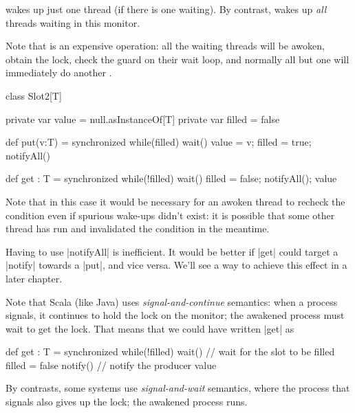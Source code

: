 
\begin{slide}


 wakes up just one thread (if there is one waiting).  By
contrast,  wakes up \emph{all} threads waiting in this
monitor. 

Note that  is an expensive operation: all the waiting
threads will be awoken, obtain the lock, check the guard on their wait loop,
and normally all but one will immediately do another .
\end{slide}


\begin{slide}

\begin{scala}
class Slot2[T]{
  private var value = null.asInstanceOf[T]
  private var filled = false

  def put(v:T) = synchronized{
    while(filled) wait()
    value = v; filled = true; notifyAll()
  }

  def get : T = synchronized{
    while(!filled) wait()
    filled = false; notifyAll(); value
  }
}
\end{scala}
%
\end{slide}


\begin{slide}

Note that in this case it would be necessary for an awoken thread to recheck
the condition even if spurious wake-ups didn't exist: it is possible that some
other thread has run and invalidated the condition in the meantime.

Having to use |notifyAll| is inefficient.  It would be better if |get| could
target a |notify| towards a |put|, and vice versa.  We'll see a way to achieve
this effect in a later chapter.
\end{slide}


\begin{slide}

Note that Scala (like Java) uses \emph{signal-and-continue} semantics: when a
process signals, it continues to hold the lock on the monitor; the
awakened process must wait to get the lock.  That means that we could have
written |get| as 
%
\begin{scala}
  def get : T = synchronized{
    while(!filled) wait() // wait for the slot to be filled
    filled = false
    notify() // notify the producer
    value
  }
\end{scala}

By contrasts, some systems use \emph{signal-and-wait} semantics, where the
process that signals also gives up the lock; the awakened process runs.
\end{slide}


